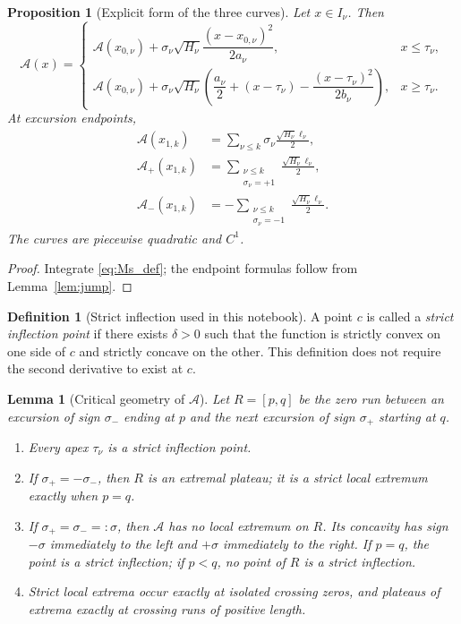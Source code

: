 \documentclass[11pt]{amsart}
\numberwithin{equation}{section}
\theoremstyle{plain}
\newtheorem{proposition}[theorem]{Proposition}
\newtheorem{lemma}[theorem]{Lemma}
\theoremstyle{definition}
\newtheorem{definition}[theorem]{Definition}
\theoremstyle{remark}
\newcommand{\Ap}{\mathcal{A}_{+}}
\newcommand{\Am}{\mathcal{A}_{-}}
\newcommand{\Anet}{\mathcal{A}}
\begin{document}
\begin{proposition}[Explicit form of the three curves]
\label{prop:explicit}
Let $x\in I_\nu$. Then
\begin{equation}
\label{eq:explicit_A}
\Anet(x)=
\begin{cases}
\Anet(x_{0,\nu})+\sigma_\nu\sqrt{H_\nu}
\dfrac{(x-x_{0,\nu})^2}{2a_\nu},&x\le\tau_\nu,\\[2ex]
\Anet(x_{0,\nu})+\sigma_\nu\sqrt{H_\nu}
\left(\dfrac{a_\nu}{2}+(x-\tau_\nu)-
\dfrac{(x-\tau_\nu)^2}{2b_\nu}\right),&x\ge\tau_\nu.
\end{cases}
\end{equation}
At excursion endpoints,
\begin{align}
\Anet(x_{1,k})&=\sum_{\nu\le k}\sigma_\nu\frac{\sqrt{H_\nu}\ell_\nu}{2},\label{eq:explicit_net}\\
\Ap(x_{1,k})&=\sum_{\substack{\nu\le k\\\sigma_\nu=+1}}
\frac{\sqrt{H_\nu}\ell_\nu}{2},\label{eq:explicit_plus}\\
\Am(x_{1,k})&=-\sum_{\substack{\nu\le k\\\sigma_\nu=-1}}
\frac{\sqrt{H_\nu}\ell_\nu}{2}.\label{eq:explicit_minus}
\end{align}
The curves are piecewise quadratic and $C^1$.
\end{proposition}

\begin{proof}
Integrate \eqref{eq:Ms_def}; the endpoint formulas follow from
Lemma~\ref{lem:jump}.
\end{proof}

\begin{definition}[Strict inflection used in this notebook]
A point $c$ is called a \emph{strict inflection point} if there exists
$\delta>0$ such that the function is strictly convex on one side of $c$ and
strictly concave on the other.  This definition does not require the second
derivative to exist at $c$.
\end{definition}

\begin{lemma}[Critical geometry of $\Anet$]
\label{lem:critical}
Let $R=[p,q]$ be the zero run between an excursion of sign $\sigma_-$ ending
at $p$ and the next excursion of sign $\sigma_+$ starting at $q$.
\begin{enumerate}[label=\textup{(\roman*)}]
\item Every apex $\tau_\nu$ is a strict inflection point.
\item If $\sigma_+=-\sigma_-$, then $R$ is an extremal plateau; it is a
strict local extremum exactly when $p=q$.
\item If $\sigma_+=\sigma_-=:\sigma$, then $\Anet$ has no local extremum on
$R$.  Its concavity has sign $-\sigma$ immediately to the left and
$+\sigma$ immediately to the right.  If $p=q$, the point is a strict
inflection; if $p<q$, no point of $R$ is a strict inflection.
\item Strict local extrema occur exactly at isolated crossing zeros, and
plateaus of extrema exactly at crossing runs of positive length.
\end{enumerate}
\end{lemma}
\end{document}
